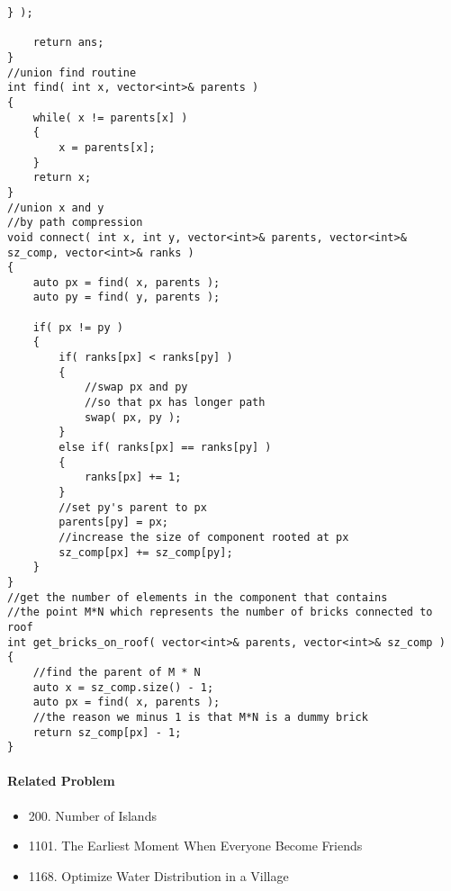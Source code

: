 \begin{lstlisting}[style=customc, caption={Union Find}]
    } );

    return ans;
}
//union find routine
int find( int x, vector<int>& parents )
{
    while( x != parents[x] )
    {
        x = parents[x];
    }
    return x;
}
//union x and y
//by path compression
void connect( int x, int y, vector<int>& parents, vector<int>& sz_comp, vector<int>& ranks )
{
    auto px = find( x, parents );
    auto py = find( y, parents );

    if( px != py )
    {
        if( ranks[px] < ranks[py] )
        {
            //swap px and py
            //so that px has longer path
            swap( px, py );
        }
        else if( ranks[px] == ranks[py] )
        {
            ranks[px] += 1;
        }
        //set py's parent to px
        parents[py] = px;
        //increase the size of component rooted at px
        sz_comp[px] += sz_comp[py];
    }
}
//get the number of elements in the component that contains
//the point M*N which represents the number of bricks connected to roof
int get_bricks_on_roof( vector<int>& parents, vector<int>& sz_comp )
{
    //find the parent of M * N
    auto x = sz_comp.size() - 1;
    auto px = find( x, parents );
    //the reason we minus 1 is that M*N is a dummy brick
    return sz_comp[px] - 1;
}
\end{lstlisting}

\paragraph{Related Problem}

\begin{itemize}
\item 200. Number of Islands
\item 1101. The Earliest Moment When Everyone Become Friends
\item 1168. Optimize Water Distribution in a Village
\end{itemize}